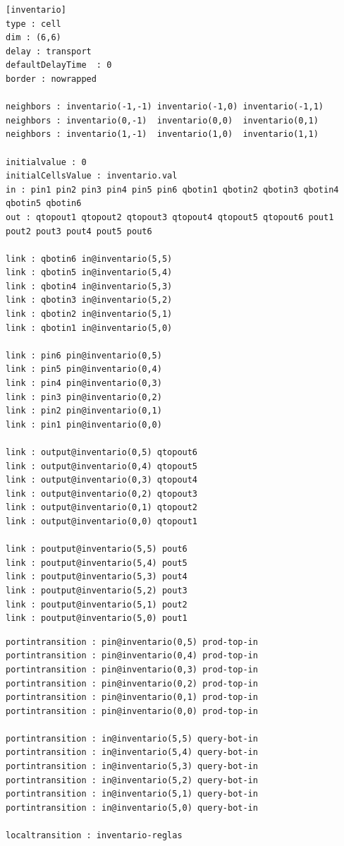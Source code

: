 \documentclass[10pt]{article}
\begin{document}
\begin{minipage}{1\textwidth}
	\centering
	\begin{lstlisting}
[inventario]
type : cell
dim : (6,6)
delay : transport
defaultDelayTime  : 0
border : nowrapped

neighbors : inventario(-1,-1) inventario(-1,0) inventario(-1,1)
neighbors : inventario(0,-1)  inventario(0,0)  inventario(0,1)
neighbors : inventario(1,-1)  inventario(1,0)  inventario(1,1)

initialvalue : 0
initialCellsValue : inventario.val
in : pin1 pin2 pin3 pin4 pin5 pin6 qbotin1 qbotin2 qbotin3 qbotin4 qbotin5 qbotin6
out : qtopout1 qtopout2 qtopout3 qtopout4 qtopout5 qtopout6 pout1 pout2 pout3 pout4 pout5 pout6

link : qbotin6 in@inventario(5,5)
link : qbotin5 in@inventario(5,4)
link : qbotin4 in@inventario(5,3)
link : qbotin3 in@inventario(5,2)
link : qbotin2 in@inventario(5,1)
link : qbotin1 in@inventario(5,0)

link : pin6 pin@inventario(0,5)
link : pin5 pin@inventario(0,4)
link : pin4 pin@inventario(0,3)
link : pin3 pin@inventario(0,2)
link : pin2 pin@inventario(0,1)
link : pin1 pin@inventario(0,0)

link : output@inventario(0,5) qtopout6
link : output@inventario(0,4) qtopout5
link : output@inventario(0,3) qtopout4
link : output@inventario(0,2) qtopout3
link : output@inventario(0,1) qtopout2
link : output@inventario(0,0) qtopout1

link : poutput@inventario(5,5) pout6
link : poutput@inventario(5,4) pout5
link : poutput@inventario(5,3) pout4
link : poutput@inventario(5,2) pout3
link : poutput@inventario(5,1) pout2
link : poutput@inventario(5,0) pout1
	\end{lstlisting}
\end{minipage}

\begin{minipage}{1\textwidth}
	\centering
	\begin{lstlisting}
portintransition : pin@inventario(0,5) prod-top-in
portintransition : pin@inventario(0,4) prod-top-in
portintransition : pin@inventario(0,3) prod-top-in
portintransition : pin@inventario(0,2) prod-top-in
portintransition : pin@inventario(0,1) prod-top-in
portintransition : pin@inventario(0,0) prod-top-in

portintransition : in@inventario(5,5) query-bot-in
portintransition : in@inventario(5,4) query-bot-in
portintransition : in@inventario(5,3) query-bot-in
portintransition : in@inventario(5,2) query-bot-in
portintransition : in@inventario(5,1) query-bot-in
portintransition : in@inventario(5,0) query-bot-in

localtransition : inventario-reglas
	\end{lstlisting}
\end{minipage}
\end{document}
